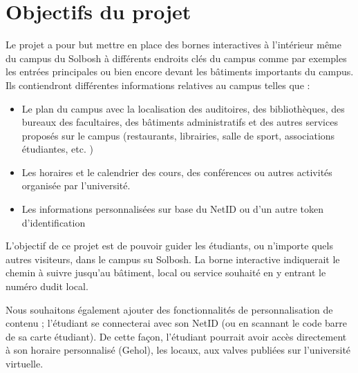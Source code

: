 \section{Objectifs du projet}
Le projet a pour but mettre en place des bornes interactives à l’intérieur même du campus du Solbosh à différents endroits clés du campus comme par exemples les entrées principales ou bien encore devant les bâtiments importants du campus. Ils contiendront différentes informations relatives au campus telles que : 
\begin{itemize}
    \item Le plan du campus avec la localisation des auditoires, des bibliothèques, des bureaux des facultaires, des bâtiments administratifs  et des autres services proposés sur le campus (restaurants, librairies, salle de sport, associations étudiantes, etc. ) 
    \item Les horaires et le calendrier des cours, des conférences ou autres activités organisée par l'université. 
    \item Les informations personnalisées sur base du NetID ou d’un autre token d’identification 
\end{itemize}

L’objectif de ce projet est de pouvoir guider les étudiants, ou n’importe quels autres visiteurs, dans le campus su Solbosh. La borne interactive indiquerait le chemin à suivre jusqu’au bâtiment, local ou service souhaité en y entrant le numéro dudit local. 

Nous souhaitons également ajouter des fonctionnalités de personnalisation de contenu ; l’étudiant se connecterai avec son NetID (ou en scannant  le code barre de sa carte étudiant). De cette façon, l’étudiant pourrait avoir accès directement à son horaire personnalisé (Gehol), les locaux, aux valves publiées sur l’université virtuelle.  




